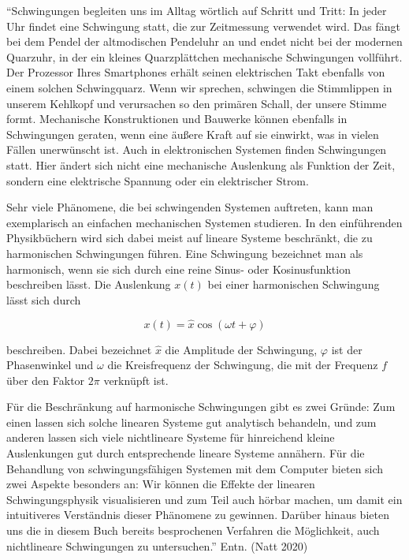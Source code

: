 \documentclass[
  ngerman,
  letterpaper,
]{scrbook}
\begin{document}
\begin{tcolorbox}[enhanced jigsaw, titlerule=0mm, rightrule=.15mm, toprule=.15mm, colback=white, toptitle=1mm, bottomrule=.15mm, coltitle=black, leftrule=.75mm, arc=.35mm, colbacktitle=quarto-callout-note-color!10!white, opacityback=0, bottomtitle=1mm, colframe=quarto-callout-note-color-frame, opacitybacktitle=0.6, breakable, title=\textcolor{quarto-callout-note-color}{\faInfo}\hspace{0.5em}{Schwingungen (phys.)}, left=2mm]

``Schwingungen begleiten uns im Alltag wörtlich auf Schritt und Tritt:
In jeder Uhr findet eine Schwingung statt, die zur Zeitmessung verwendet
wird. Das fängt bei dem Pendel der altmodischen Pendeluhr an und endet
nicht bei der modernen Quarzuhr, in der ein kleines Quarzplättchen
mechanische Schwingungen vollführt. Der Prozessor Ihres Smartphones
erhält seinen elektrischen Takt ebenfalls von einem solchen
Schwingquarz. Wenn wir sprechen, schwingen die Stimmlippen in unserem
Kehlkopf und verursachen so den primären Schall, der unsere Stimme
formt. Mechanische Konstruktionen und Bauwerke können ebenfalls in
Schwingungen geraten, wenn eine äußere Kraft auf sie einwirkt, was in
vielen Fällen unerwünscht ist. Auch in elektronischen Systemen finden
Schwingungen statt. Hier ändert sich nicht eine mechanische Auslenkung
als Funktion der Zeit, sondern eine elektrische Spannung oder ein
elektrischer Strom.

Sehr viele Phänomene, die bei schwingenden Systemen auftreten, kann man
exemplarisch an einfachen mechanischen Systemen studieren. In den
einführenden Physikbüchern wird sich dabei meist auf lineare Systeme
beschränkt, die zu harmonischen Schwingungen führen. Eine Schwingung
bezeichnet man als harmonisch, wenn sie sich durch eine reine Sinus-
oder Kosinusfunktion beschreiben lässt. Die Auslenkung \(x(t)\) bei
einer harmonischen Schwingung lässt sich durch

\[
x(t) = \hat{x} \cos(\omega t + \varphi)
\]

beschreiben. Dabei bezeichnet \(\hat{x}\) die Amplitude der Schwingung,
\(\varphi\) ist der Phasenwinkel und \(\omega\) die Kreisfrequenz der
Schwingung, die mit der Frequenz \(f\) über den Faktor \(2 \pi\)
verknüpft ist.

Für die Beschränkung auf harmonische Schwingungen gibt es zwei Gründe:
Zum einen lassen sich solche linearen Systeme gut analytisch behandeln,
und zum anderen lassen sich viele nichtlineare Systeme für hinreichend
kleine Auslenkungen gut durch entsprechende lineare Systeme annähern.
Für die Behandlung von schwingungsfähigen Systemen mit dem Computer
bieten sich zwei Aspekte besonders an: Wir können die Effekte der
linearen Schwingungsphysik visualisieren und zum Teil auch hörbar
machen, um damit ein intuitiveres Verständnis dieser Phänomene zu
gewinnen. Darüber hinaus bieten uns die in diesem Buch bereits
besprochenen Verfahren die Möglichkeit, auch nichtlineare Schwingungen
zu untersuchen.'' Entn. (Natt 2020)

\end{tcolorbox}
\end{document}
